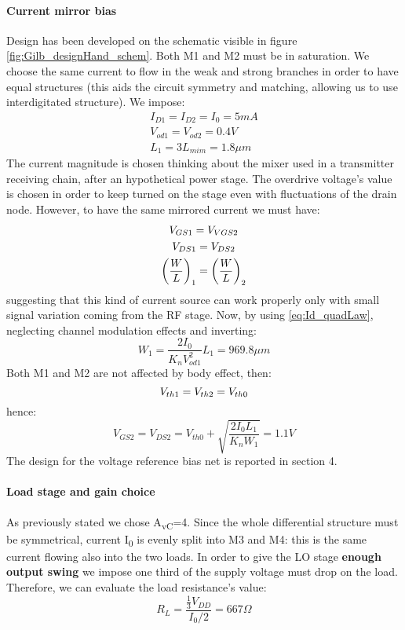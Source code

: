 \paragraph{Current mirror bias}
Design has been developed on the schematic visible in figure \ref{fig:Gilb_designHand_schem}.
Both M1 and M2 must be in saturation. We choose the same current to flow in the weak and strong branches in order to have equal structures (this aids the circuit symmetry and matching, allowing us to use interdigitated structure). We impose:
\begin{gather}
I_{D1} = I_{D2} = I_0 = 5 mA  \\
V_{od1}=V_{od2}=0.4 V  \\
L_1 =3 L_{mim} = 1.8 \mu m 
\end{gather} 
The current magnitude is chosen thinking about the mixer used in a transmitter receiving chain, after an hypothetical power stage. The overdrive voltage's value is chosen in order to keep turned on the stage even with fluctuations of the drain node. However, to have the same mirrored current we must have:
\begin{gather}
	V_{GS1} = V_{VGS2} \notag \\
	V_{DS1} = V_{DS2} \notag \\
	\left(\frac{W}{L}\right)_1 = \left(\frac{W}{L}\right)_2 \notag 
\end{gather}
suggesting that this kind of current source can work properly only with small signal variation coming from the RF stage. Now, by using \ref{eq:Id_quadLaw}, neglecting channel modulation effects and inverting:
\begin{equation}
W_1 = \frac{2I_0}{K_n V_{od1}^2}L_1 = 969.8 \mu m
\end{equation}
Both M1 and M2 are not affected by body effect, then:
\begin{equation}
	V_{th1}=V_{th2}=V_{th0} \notag \\
\end{equation}
hence:
\begin{equation}
V_{GS2}=V_{DS2}= V_{th0}+\sqrt{\frac{2I_0L_1}{K_n W_1 }} = 1.1 V
\end{equation}
The design for the voltage reference bias net is reported in section 4.
\paragraph{Load stage and gain choice}
As previously stated we chose A\textsubscript{vC}=4. 
Since the whole differential structure must be symmetrical, current I\textsubscript{0} is evenly split into M3 and M4: this is the same current flowing also into the two loads. In order to give the LO stage \textbf{enough output swing} we impose one third of the supply voltage must drop on the load. Therefore, we can evaluate the load resistance's value:
\begin{equation}
R_L = \frac{\frac{1}{3}V_{DD}}{I_0/2} = 667\Omega
\end{equation}

